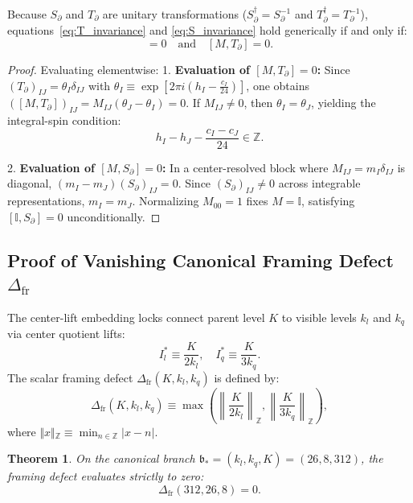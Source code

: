 \documentclass[11pt]{article}
\theoremstyle{plain}
\newtheorem{theorem}{Theorem}
\begin{document}
Because $S_{\partial}$ and $T_{\partial}$ are unitary transformations ($S_{\partial}^\dagger = S_{\partial}^{-1}$ and $T_{\partial}^\dagger = T_{\partial}^{-1}$), equations~\eqref{eq:T_invariance} and \eqref{eq:S_invariance} hold generically if and only if:
\begin{equation}
[M, S_{\partial}] = 0 \quad \text{and} \quad [M, T_{\partial}] = 0.
\end{equation}

\begin{proof}
Evaluating elementwise:
1. \textbf{Evaluation of $[M, T_{\partial}] = 0$:}
Since $(T_{\partial})_{IJ} = \theta_I \delta_{IJ}$ with $\theta_I \equiv \exp\left[ 2\pi i \left( h_I - \frac{c_I}{24} \right) \right]$, one obtains $([M, T_{\partial}])_{IJ} = M_{IJ} (\theta_J - \theta_I) = 0$. If $M_{IJ} \neq 0$, then $\theta_I = \theta_J$, yielding the integral-spin condition:
\begin{equation}
h_I - h_J - \frac{c_I - c_J}{24} \in \mathbb{Z}.
\end{equation}

2. \textbf{Evaluation of $[M, S_{\partial}] = 0$:}
In a center-resolved block where $M_{IJ} = m_I \delta_{IJ}$ is diagonal, $(m_I - m_J) (S_{\partial})_{IJ} = 0$. Since $(S_{\partial})_{IJ} \neq 0$ across integrable representations, $m_I = m_J$. Normalizing $M_{00} = 1$ fixes $M = \mathbb{I}$, satisfying $[\mathbb{I}, S_{\partial}] = 0$ unconditionally.
\end{proof}

\subsection{Proof of Vanishing Canonical Framing Defect \texorpdfstring{$\Delta_{\text{fr}}$}{Delta-fr}}
The center-lift embedding locks connect parent level $K$ to visible levels $k_l$ and $k_q$ via center quotient lifts:
\begin{equation}
I_l^* \equiv \frac{K}{2 k_l}, \quad I_q^* \equiv \frac{K}{3 k_q}.
\end{equation}
The scalar framing defect $\Delta_{\text{fr}}(K, k_l, k_q)$ is defined by:
\begin{equation}
\Delta_{\text{fr}}(K, k_l, k_q) \equiv \max\left( \left\| \frac{K}{2 k_l} \right\|_{\mathbb{Z}}, \left\| \frac{K}{3 k_q} \right\|_{\mathbb{Z}} \right),
\end{equation}
where $\Vert{} x \Vert{}_{\mathbb{Z}} \equiv \min_{n \in \mathbb{Z}} \vert{}x - n\vert{}$.

\begin{theorem}
On the canonical branch $\mathfrak{b}_* = (k_l, k_q, K) = (26, 8, 312)$, the framing defect evaluates strictly to zero:
\begin{equation}
\Delta_{\text{fr}}(312, 26, 8) = 0.
\end{equation}
\end{theorem}
\end{document}
